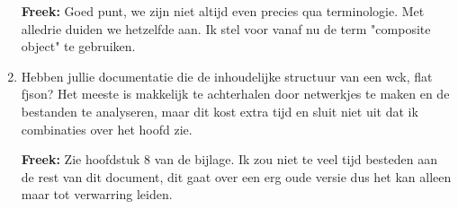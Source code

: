 \begin{enumerate}
\textbf{Freek:} Goed punt, we zijn niet altijd even precies qua terminologie. Met alledrie duiden we hetzelfde aan. Ik stel voor vanaf nu de term "composite object" te gebruiken.

\item Hebben jullie documentatie die de inhoudelijke structuur van een wck, flat fjson? Het meeste is makkelijk te achterhalen door netwerkjes te maken en de bestanden te analyseren, maar dit kost extra tijd en sluit niet uit dat ik combinaties over het hoofd zie.

\textbf{Freek:} Zie hoofdstuk 8 van de bijlage. Ik zou niet te veel tijd besteden aan de rest van dit document, dit gaat over een erg oude versie dus het kan alleen maar tot verwarring leiden.

\end{enumerate}


